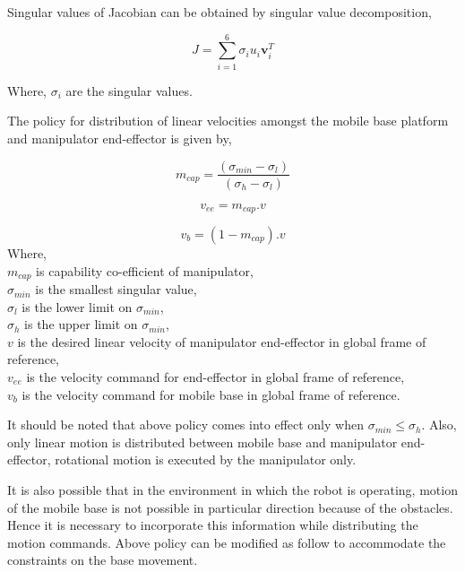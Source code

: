 Singular values of Jacobian can be obtained by singular value decomposition,

\begin{equation}
	J = \sum_{i=1}^{6}\sigma_{i}u_{i}\textbf{v}_{i}^{T}
\end{equation}   

Where, $\sigma_{i}$ are the singular values. 

The policy for distribution of linear velocities amongst the mobile base platform and manipulator end-effector is given by,

\begin{equation}
	m_{cap} = \frac{(\sigma_{min} - \sigma_{l})}{(\sigma_{h} - \sigma_{l})}
\end{equation}

\begin{equation}
	v_{ee} = m_{cap}.v
\end{equation} 

\begin{equation}
	v_{b} = (1 - m_{cap}).v
\end{equation} 
Where, \\
$m_{cap}$ is capability co-efficient of manipulator, \\
$\sigma_{min}$ is the smallest singular value, \\
$\sigma_{l}$ is the lower limit on $\sigma_{min}$, \\
$\sigma_{h}$ is the upper limit on $\sigma_{min}$, \\
$v$ is the desired linear velocity of manipulator end-effector in global frame of reference, \\ 
$v_{ee}$ is the velocity command for end-effector in global frame of reference, \\
$v_{b}$ is the velocity command for mobile base in global frame of reference.


It should be noted that above policy comes into effect only when $\sigma_{min} \le \sigma_{h}$. Also, only linear motion is distributed between mobile base and manipulator end-effector, rotational motion is executed by the manipulator only.


It is also possible that in the environment in which the robot is operating, motion of the mobile base is not possible in particular direction because of the obstacles. Hence it is necessary to incorporate this information while distributing the motion commands. Above policy can be modified as follow to accommodate the constraints on the base movement.


